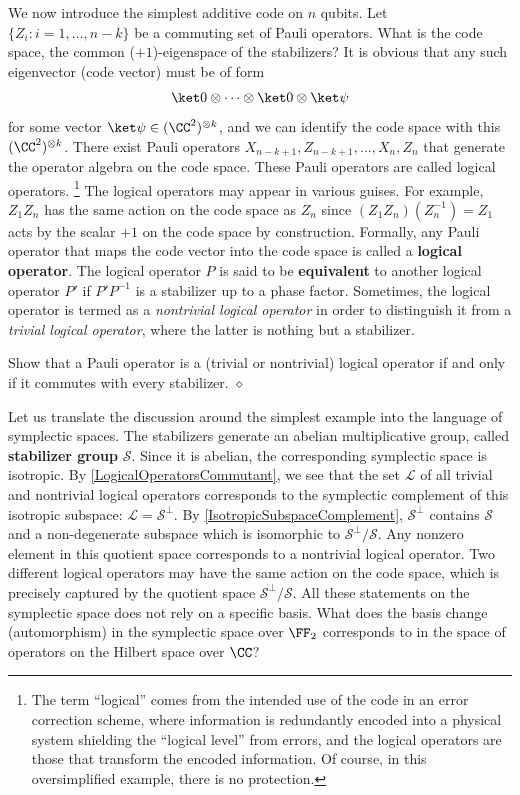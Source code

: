 We now introduce the simplest additive code on $n$ qubits.
Let $\{ Z_i : i = 1,\ldots, n-k \}$ be a commuting set of Pauli operators.
What is the code space, the common ($+1$)-eigenspace of the stabilizers?
It is obvious that any such eigenvector (code vector) must be of form
\begin{align}
\ket 0 \otimes  \cdots \otimes \ket 0 \otimes \ket \psi
\label{eq:trivialCodeVectors}
\end{align}
for some vector $\ket \psi \in (\CC^2)^{\otimes k}$,
and we can identify the code space with this $(\CC^2)^{\otimes k}$.
There exist Pauli operators $X_{n-k+1}, Z_{n-k+1},\ldots, X_n, Z_n$
that generate the operator algebra on the code space.
These Pauli operators are called logical operators.%
\footnote{
The term ``logical'' comes from the intended use of the code in an error correction scheme,
where information is redundantly encoded into a physical system
shielding the ``logical level'' from errors, and the logical operators are those
that transform the encoded information.
Of course, in this oversimplified example, there is no protection.
}
The logical operators may appear in various guises.
For example, $Z_1 Z_n$ has the same action on the code space as $Z_n$ since
$(Z_1 Z_n) (Z_n^{-1}) = Z_1$ acts by the scalar $+1$ on the code space
by construction.
Formally, any Pauli operator that maps the code vector into the code space 
is called a {\bf logical operator}.
The logical operator $P$ is said to be {\bf equivalent} to another logical operator $P'$
if $P'P^{-1}$ is a stabilizer up to a phase factor.
Sometimes, the logical operator is termed as a {\em nontrivial logical operator}
in order to distinguish it from a {\em trivial logical operator},
where the latter is nothing but a stabilizer.
\begin{exc}
Show that a Pauli operator is a (trivial or nontrivial) logical operator
if and only if it commutes with every stabilizer.
\label{LogicalOperatorsCommutant}
\hfill $\diamond$ \end{exc}

Let us translate the discussion around the simplest example into the language of symplectic spaces.
The stabilizers generate an abelian multiplicative group, called {\bf stabilizer group} $\mathcal S$.
Since it is abelian, the corresponding symplectic space is isotropic.
By \ref{LogicalOperatorsCommutant}, we see that the set $\mathcal L$
of all trivial and nontrivial logical operators
corresponds to the symplectic complement of this isotropic subspace: $\mathcal L = \mathcal S^\perp$.
By \ref{IsotropicSubspaceComplement}, $\mathcal S^\perp$
contains $\mathcal S$ and a non-degenerate subspace which is isomorphic to $\mathcal S^\perp / \mathcal S$.
Any nonzero element in this quotient space corresponds to a nontrivial logical operator.
Two different logical operators may have the same action on the code space,
which is precisely captured by the quotient space $\mathcal S^\perp / \mathcal S$.
All these statements on the symplectic space does not rely on a specific basis.
What does the basis change (automorphism) in the symplectic space over $\FF_2$ corresponds to
in the space of operators on the Hilbert space over $\CC$?

